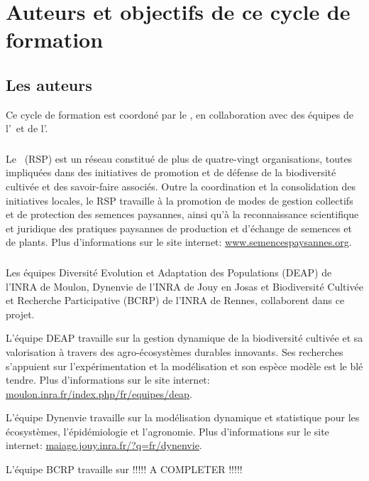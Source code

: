 \section{Auteurs et objectifs de ce cycle de formation}

\subsection{Les auteurs}

Ce cycle de formation est coordoné par le \RSP, en collaboration avec des équipes de l'\INRA~et de l'\ITAB.

\subsubsection{\RSP}
Le \RSP~(RSP) est un réseau constitué de plus de quatre-vingt organisations, toutes impliquées dans des initiatives de promotion et de défense de la biodiversité cultivée et des savoir-faire associés.
Outre la coordination et la consolidation des initiatives locales, le RSP travaille à la promotion de modes de gestion collectifs et de protection des semences paysannes, ainsi qu'à la reconnaissance scientifique et juridique des pratiques paysannes de production et d'échange de semences et de plants.
Plus d'informations sur le site internet: \url{www.semencespaysannes.org}.

\subsubsection{\INRA}
Les équipes 
Diversité Evolution et Adaptation des Populations (DEAP) de l'INRA de Moulon, 
Dynenvie de l'INRA de Jouy en Josas et 
Biodiversité Cultivée et Recherche Participative (BCRP) de l'INRA de Rennes, 
collaborent dans ce projet.

L'équipe DEAP travaille sur la gestion dynamique de la biodiversité cultivée et sa valorisation à travers des agro-écosystèmes durables innovants. 
Ses recherches s'appuient sur l'expérimentation et la modélisation et son espèce modèle est le blé tendre.
Plus d'informations sur le site internet: \url{moulon.inra.fr/index.php/fr/equipes/deap}.

L'équipe Dynenvie travaille sur la modélisation dynamique et statistique pour les écosystèmes, l'épidémiologie et l'agronomie.
Plus d'informations sur le site internet: \url{maiage.jouy.inra.fr/?q=fr/dynenvie}.

L'équipe BCRP travaille sur !!!!! A COMPLETER !!!!!

